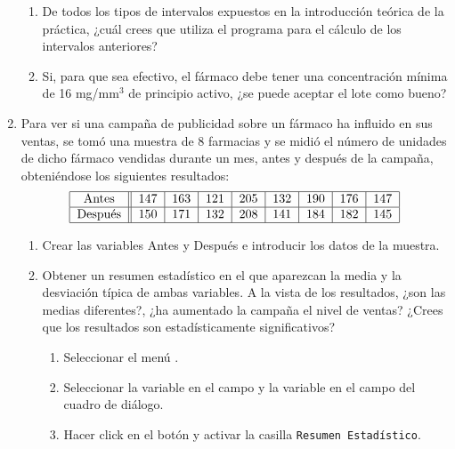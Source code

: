 \documentclass[a4paper]{article}
\begin{document}
\begin{enumerate}[leftmargin=*]
\begin{enumerate}
\item  De todos los tipos de intervalos expuestos en la introducción teórica de la práctica, ¿cuál crees que utiliza el programa para el cálculo de los intervalos anteriores?

\item Si, para que sea efectivo, el fármaco debe tener una concentración
mínima de 16 mg/mm$^3$ de principio activo, ¿se puede aceptar el lote como bueno?
\end{enumerate}

\item  Para ver si una campaña de publicidad sobre un
fármaco ha influido en sus ventas, se tomó una muestra de
8 farmacias y se midió el número de unidades de dicho
fármaco vendidas durante un mes, antes y después de la
campaña, obteniéndose los siguientes resultados:
\[
\begin{tabular}{|c||c|c|c|c|c|c|c|c|}
\hline Antes & 147 & 163 & 121 & 205 & 132 & 190 & 176 & 147 \\
\hline Después & 150 & 171 & 132 & 208 & 141 & 184 & 182 & 145
\\ \hline
\end{tabular}
\]

\begin {enumerate}
\item Crear las variables \textsf{Antes} y \textsf{Después} e
introducir los datos de la muestra.

\item Obtener un resumen estadístico en el que aparezcan la media y la desviación típica de ambas variables. A la vista de los resultados, ¿son las medias diferentes?, ¿ha aumentado la campaña el nivel de ventas? ¿Crees que los resultados son estadísticamente significativos?
\begin{indicacion}{
\begin{enumerate}
\item Seleccionar el menú .
\item Seleccionar la variable  en el campo  y la variable  en el campo  del cuadro de diálogo.
\item Hacer click en el botón  y activar la casilla \texttt{Resumen Estadístico}.
\end{enumerate}}
\end{indicacion} 


\end{enumerate}
\end{enumerate}
\end{document}
